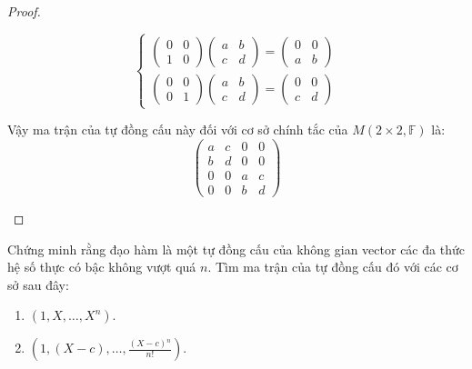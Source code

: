 \documentclass[class=nhvh-linear-algebra,crop=false]{standalone}
\begin{document}
\begin{proof}
\begin{enumerate}[label = (\alph*)]
\[\begin{cases}
                      \begin{pmatrix}
                          0 & 0 \\
                          1 & 0
                      \end{pmatrix}
                      \begin{pmatrix}
                          a & b \\
                          c & d
                      \end{pmatrix}=
                      \begin{pmatrix}
                          0 & 0 \\
                          a & b
                      \end{pmatrix} \\
                      \begin{pmatrix}
                          0 & 0 \\
                          0 & 1
                      \end{pmatrix}
                      \begin{pmatrix}
                          a & b \\
                          c & d
                      \end{pmatrix}=
                      \begin{pmatrix}
                          0 & 0 \\
                          c & d
                      \end{pmatrix}
                  \end{cases}
              \]
              \par Vậy ma trận của tự đồng cấu này đối với cơ sở chính tắc của $M(2\times 2,\mathbb{F})$ là:
              \[
                  \begin{pmatrix}
                      a & c & 0 & 0 \\
                      b & d & 0 & 0 \\
                      0 & 0 & a & c \\
                      0 & 0 & b & d
                  \end{pmatrix}
              \]
    \end{enumerate}
\end{proof}

\begin{exercise}
    Chứng minh rằng đạo hàm là một tự đồng cấu của không gian vector các đa thức hệ số thực có bậc không vượt quá $n$. Tìm ma trận của tự đồng cấu đó với các cơ sở sau đây:
    \begin{enumerate}[label = (\alph*)]
        \item $(1, X, \ldots, X^{n})$.
        \item $(1, (X-c), \ldots, \frac{(X-c){}^{n}}{n!})$.
    \end{enumerate}
\end{exercise}
\end{document}
